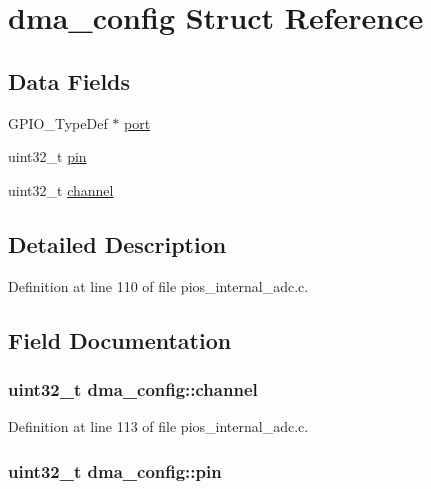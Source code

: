 \hypertarget{structdma__config}{\section{dma\-\_\-config \-Struct \-Reference}
\label{structdma__config}
}
\subsection*{\-Data \-Fields}
\begin{DoxyCompactItemize}
\item 
\-G\-P\-I\-O\-\_\-\-Type\-Def $\ast$ \hyperlink{structdma__config_a6cbbf1d4f1761343da79031c358d28da}{port}
\item 
uint32\-\_\-t \hyperlink{structdma__config_afdda59a07cc2955f33391d811ecad5eb}{pin}
\item 
uint32\-\_\-t \hyperlink{structdma__config_a52803afd9586446133f03f95c909ba19}{channel}
\end{DoxyCompactItemize}


\subsection{\-Detailed \-Description}


\-Definition at line 110 of file pios\-\_\-internal\-\_\-adc.\-c.



\subsection{\-Field \-Documentation}
\hypertarget{structdma__config_a52803afd9586446133f03f95c909ba19}{
\subsubsection[{channel}]{\setlength{\rightskip}{0pt plus 5cm}uint32\-\_\-t {\bf dma\-\_\-config\-::channel}}}\label{structdma__config_a52803afd9586446133f03f95c909ba19}


\-Definition at line 113 of file pios\-\_\-internal\-\_\-adc.\-c.

\hypertarget{structdma__config_afdda59a07cc2955f33391d811ecad5eb}{
\subsubsection[{pin}]{\setlength{\rightskip}{0pt plus 5cm}uint32\-\_\-t {\bf dma\-\_\-config\-::pin}}}\label{structdma__config_afdda59a07cc2955f33391d811ecad5eb}


